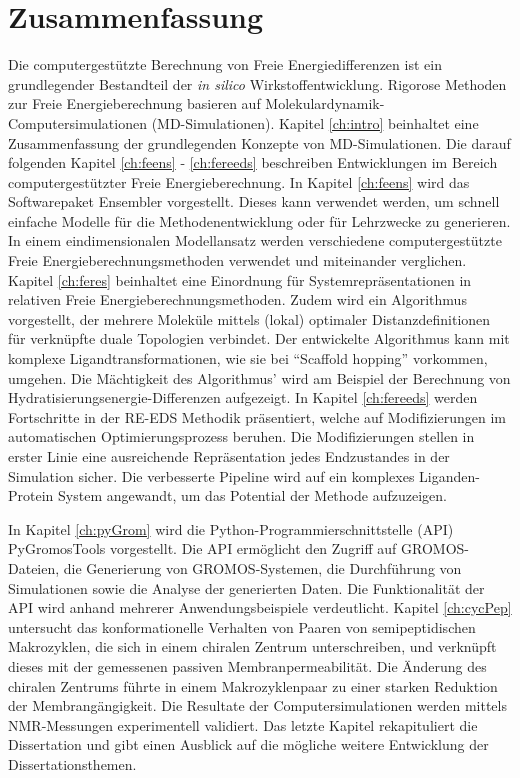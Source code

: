 \chapter{Zusammenfassung}
Die computergestützte Berechnung von Freie Energiedifferenzen ist ein grundlegender Bestandteil der \textit{in silico} Wirkstoffentwicklung. Rigorose Methoden zur Freie Energieberechnung basieren auf Molekulardynamik-Computersimulationen (MD-Simulationen). Kapitel \ref{ch:intro} beinhaltet eine Zusammenfassung der grundlegenden Konzepte von MD-Simulationen. 
Die darauf folgenden Kapitel \ref{ch:feens} - \ref{ch:fereeds} beschreiben Entwicklungen im Bereich computergestützter Freie Energieberechnung. 
In Kapitel \ref{ch:feens} wird das Softwarepaket Ensembler vorgestellt. Dieses kann verwendet werden, um schnell einfache Modelle für die Methodenentwicklung oder für Lehrzwecke zu generieren. In einem eindimensionalen Modellansatz werden verschiedene computergestützte Freie Energieberechnungsmethoden verwendet und miteinander verglichen. 
Kapitel \ref{ch:feres} beinhaltet eine Einordnung für Systemrepräsentationen in relativen Freie Energieberechnungsmethoden. Zudem wird ein Algorithmus vorgestellt, der mehrere Moleküle mittels (lokal) optimaler Distanzdefinitionen für verknüpfte duale Topologien verbindet. Der entwickelte Algorithmus kann mit komplexe Ligandtransformationen, wie sie bei ``Scaffold hopping'' vorkommen, umgehen. Die Mächtigkeit des Algorithmus' wird am Beispiel der Berechnung von Hydratisierungsenergie-Differenzen aufgezeigt.
In Kapitel \ref{ch:fereeds} werden Fortschritte in der RE-EDS Methodik präsentiert, welche auf Modifizierungen im automatischen Optimierungsprozess beruhen. Die Modifizierungen stellen in erster Linie eine ausreichende Repräsentation jedes Endzustandes in der Simulation sicher. Die verbesserte Pipeline wird auf ein komplexes Liganden-Protein System angewandt, um das Potential der Methode aufzuzeigen.

In Kapitel \ref{ch:pyGrom} wird die Python-Programmierschnittstelle (API) PyGromosTools vorgestellt. Die API ermöglicht den Zugriff auf GROMOS-Dateien, die Generierung von GROMOS-Systemen, die Durchführung von Simulationen sowie die Analyse der generierten Daten. Die Funktionalität der API wird anhand mehrerer Anwendungsbeispiele verdeutlicht.
Kapitel \ref{ch:cycPep} untersucht das konformationelle Verhalten von Paaren von semipeptidischen Makrozyklen, die sich in einem chiralen Zentrum unterschreiben, und verknüpft dieses mit der gemessenen passiven Membranpermeabilität. Die Änderung des chiralen Zentrums führte in einem Makrozyklenpaar zu einer starken  Reduktion der Membrangängigkeit. Die Resultate der Computersimulationen werden mittels NMR-Messungen experimentell validiert.
Das letzte Kapitel rekapituliert die Dissertation und gibt einen Ausblick auf die mögliche weitere Entwicklung der Dissertationsthemen.


